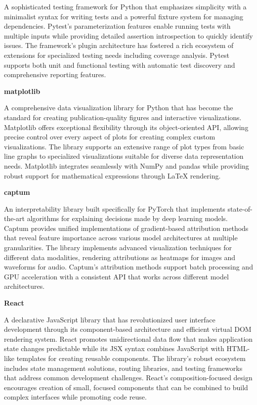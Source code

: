 \documentclass[
    bindingoffset=5mm,  %
    footnoteindent=3mm, %
    hyphenation=true    %
]{src/wut-thesis}
\begin{document}
\begin{description}
A sophisticated testing framework for Python that emphasizes simplicity with a minimalist syntax for writing tests and a powerful fixture system for managing dependencies. Pytest's parameterization features enable running tests with multiple inputs while providing detailed assertion introspection to quickly identify issues. The framework's plugin architecture has fostered a rich ecosystem of extensions for specialized testing needs including coverage analysis. Pytest supports both unit and functional testing with automatic test discovery and comprehensive reporting features.

\item \textbf{matplotlib}

A comprehensive data visualization library for Python that has become the standard for creating publication-quality figures and interactive visualizations. Matplotlib offers exceptional flexibility through its object-oriented API, allowing precise control over every aspect of plots for creating complex custom visualizations. The library supports an extensive range of plot types from basic line graphs to specialized visualizations suitable for diverse data representation needs. Matplotlib integrates seamlessly with NumPy and pandas while providing robust support for mathematical expressions through LaTeX rendering.

\item \textbf{captum}

An interpretability library built specifically for PyTorch that implements state-of-the-art algorithms for explaining decisions made by deep learning models. Captum provides unified implementations of gradient-based attribution methods that reveal feature importance across various model architectures at multiple granularities. The library implements advanced visualization techniques for different data modalities, rendering attributions as heatmaps for images and waveforms for audio. Captum's attribution methods support batch processing and GPU acceleration with a consistent API that works across different model architectures.

\item \textbf{React}

A declarative JavaScript library that has revolutionized user interface development through its component-based architecture and efficient virtual DOM rendering system. React promotes unidirectional data flow that makes application state changes predictable while its JSX syntax combines JavaScript with HTML-like templates for creating reusable components. The library's robust ecosystem includes state management solutions, routing libraries, and testing frameworks that address common development challenges. React's composition-focused design encourages creation of small, focused components that can be combined to build complex interfaces while promoting code reuse.
\end{description}
\end{document}
